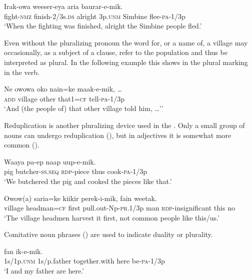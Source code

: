 \ea%
\label{ex:x1289}
\gll Irak-owa  weeser-eya  aria     baurar-e-mik.\\
fight-\textsc{nmz}  finish-2/3s.\textsc{ds}  alright  3p.\textsc{unm}  Simbine flee-\textsc{pa}-1/3p\\
\glt `When the fighting was finished, alright the Simbine people fled.'
\z

Even without the pluralizing pronoun the word for, or a name of, a village may occasionally, as a subject of a clause, refer to the population and thus be interpreted as plural. In the following example this shows in the plural marking in the verb. 

\ea%
\label{ex:x1307}
\gll Ne  owowa  oko  nain=ke  maak-e-mik,  {\dots} \\
\textsc{add}  village  other  that1=\textsc{cf}  tell-\textsc{pa}-1/3p\\
\glt `And (the people of) that other village told him, {\dots}''
\z

Reduplication is another pluralizing device used in the . Only a small group of nouns can undergo reduplication (), but in adjectives it is somewhat more common ().

\ea%
\label{ex:x1290}
\gll Waaya  pa-ep    naap  uup-e-mik. \\
pig  butcher-\textsc{ss}.\textsc{seq}  \textsc{rdp}-piece  thus  cook-\textsc{pa}-1/3p\\
\glt `We butchered the pig and cooked the pieces like that.'
\z

\ea%
\label{ex:x1291}
\gll Owow(a)  saria=ke  kiikir  perek-i-mik,     fain  weetak.\\
village  headman=\textsc{cf}  first  pull.out-Np-\textsc{pr}.1/3p man  \textsc{rdp}-insignificant  this  no\\
\glt `The village headmen harvest it first, not common people like this/us.'
\z

Comitative noun phrases () are used to indicate duality or plurality. 

\ea%
\label{ex:x1292}
\gll {}      fan  ik-e-mik. \\
1s/1p.\textsc{unm}  1s/p.father  together.with  here  be-\textsc{pa}-1/3p\\
\glt `I and my father are here.'
\z

